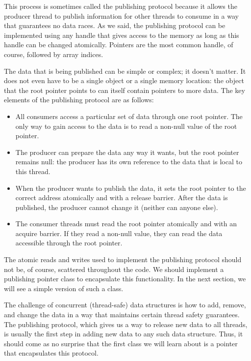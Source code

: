 This process is sometimes called the publishing protocol because it allows the producer thread to publish information for other threads to consume in a way that guarantees no data races. As we said, the publishing protocol can be implemented using any handle that gives access to the memory as long as this handle can be changed atomically. Pointers are the most common handle, of course, followed by array indices.

The data that is being published can be simple or complex; it doesn't matter. It does not even have to be a single object or a single memory location: the object that the root pointer points to can itself contain pointers to more data. The key elements of the publishing protocol are as follows:

\begin{itemize}
\item
All consumers access a particular set of data through one root pointer. The only way to gain access to the data is to read a non-null value of the root pointer.

\item
The producer can prepare the data any way it wants, but the root pointer remains null: the producer has its own reference to the data that is local to this thread.

\item 
When the producer wants to publish the data, it sets the root pointer to the correct address atomically and with a release barrier. After the data is published, the producer cannot change it (neither can anyone else).

\item 
The consumer threads must read the root pointer atomically and with an acquire barrier. If they read a non-null value, they can read the data accessible through the root pointer.

\end{itemize}

The atomic reads and writes used to implement the publishing protocol should not be, of course, scattered throughout the code. We should implement a publishing pointer class to encapsulate this functionality. In the next section, we will see a simple version of such a class.


The challenge of concurrent (thread-safe) data structures is how to add, remove, and change the data in a way that maintains certain thread safety guarantees. The publishing protocol, which gives us a way to release new data to all threads, is usually the first step in adding new data to any such data structure. Thus, it should come as no surprise that the first class we will learn about is a pointer that encapsulates this protocol.

